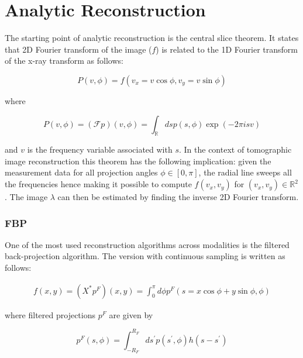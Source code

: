 \section{Analytic Reconstruction}

The starting point of analytic reconstruction is the central slice theorem. It states that 2D Fourier transform of the image ($f$) is related to the 1D Fourier transform of the x-ray transform as follows:

\begin{equation}
P(v, \phi)=f\left(v_{x}=v \cos \phi, v_{y}=v \sin \phi\right)
\end{equation} 

where

\begin{equation}
P(v, \phi)=(\mathcal{F} p)(v, \phi)=\int_{\mathbb{R}} d s p(s, \phi) \exp (-2 \pi i s v)
\end{equation}

and $v$ is the frequency variable associated with $s$. In the context of tomographic image reconstruction this theorem has the following implication: given the measurement data for all projection angles $\phi \in [0,\pi]$, the radial line sweeps all the frequencies hence making it possible to compute $f(v_{x},v_{y})$ for $(v_{x},v_{y})\in \mathbb{R}^2$. The image $\lambda$ can then be estimated by finding the inverse 2D Fourier transform. 

\subsubsection{\ac{FBP}}

One of the most used reconstruction algorithms across modalities is the filtered back-projection algorithm. The version with continuous sampling is written as follows:


\begin{equation}
\begin{array}{l}
f(x, y)=\left(X^{*} p^{F}\right)(x, y)= 
\int_{0}^{\pi} d \phi p^{F}(s=x \cos \phi+y \sin \phi, \phi)
\end{array}
\end{equation}


where filtered projections $p^{F}$ are given by

\begin{equation}
p^{F}(s, \phi)=\int_{-R_{F}}^{R_{F}} d s^{\prime} p\left(s^{\prime}, \phi\right) h\left(s-s^{\prime}\right)
\end{equation}


